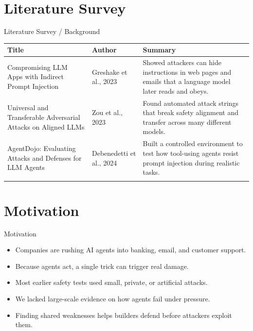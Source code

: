 \documentclass[10pt]{beamer}
\begin{document}
\section{Literature Survey}
\begin{frame}{Literature Survey / Background}
  \small
  \begin{tabular}{@{}p{2.7cm}p{2.3cm}p{5.6cm}@{}}
    \toprule
    \textbf{Title} & \textbf{Author} & \textbf{Summary} \\
    \midrule
    Compromising LLM Apps with Indirect Prompt Injection & Greshake et al., 2023 & Showed attackers can hide instructions in web pages and emails that a language model later reads and obeys. \\
    \addlinespace
    Universal and Transferable Adversarial Attacks on Aligned LLMs & Zou et al., 2023 & Found automated attack strings that break safety alignment and transfer across many different models. \\
    \addlinespace
    AgentDojo: Evaluating Attacks and Defenses for LLM Agents & Debenedetti et al., 2024 & Built a controlled environment to test how tool-using agents resist prompt injection during realistic tasks. \\
    \addlinespace
    \bottomrule
  \end{tabular}
\end{frame}
\section{Motivation}
\begin{frame}{Motivation}
\begin{itemize}
  \item Companies are rushing AI agents into banking, email, and customer support.
  \item Because agents act, a single trick can trigger real damage.
  \item Most earlier safety tests used small, private, or artificial attacks.
  \item We lacked large-scale evidence on how agents fail under pressure.
  \item Finding shared weaknesses helps builders defend before attackers exploit them.
\end{itemize}
\end{frame}
\end{document}
